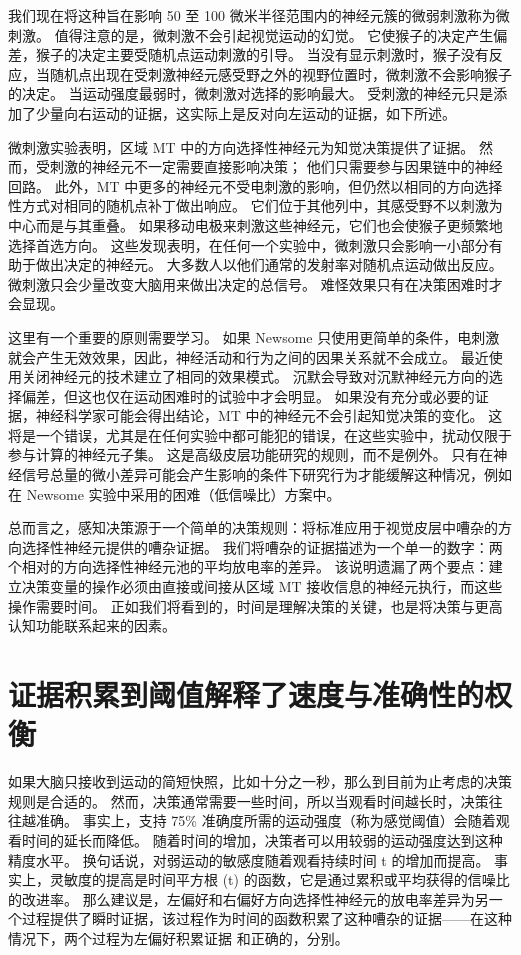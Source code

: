 我们现在将这种旨在影响 50 至 100 微米半径范围内的神经元簇的微弱刺激称为微刺激。
值得注意的是，微刺激不会引起视觉运动的幻觉。
它使猴子的决定产生偏差，猴子的决定主要受随机点运动刺激的引导。
当没有显示刺激时，猴子没有反应，当随机点出现在受刺激神经元感受野之外的视野位置时，微刺激不会影响猴子的决定。
当运动强度最弱时，微刺激对选择的影响最大。
受刺激的神经元只是添加了少量向右运动的证据，这实际上是反对向左运动的证据，如下所述。


微刺激实验表明，区域 MT 中的方向选择性神经元为知觉决策提供了证据。
然而，受刺激的神经元不一定需要直接影响决策；
他们只需要参与因果链中的神经回路。
此外，MT 中更多的神经元不受电刺激的影响，但仍然以相同的方向选择性方式对相同的随机点补丁做出响应。
它们位于其他列中，其感受野不以刺激为中心而是与其重叠。
如果移动电极来刺激这些神经元，它们也会使猴子更频繁地选择首选方向。
这些发现表明，在任何一个实验中，微刺激只会影响一小部分有助于做出决定的神经元。
大多数人以他们通常的发射率对随机点运动做出反应。
微刺激只会少量改变大脑用来做出决定的总信号。
难怪效果只有在决策困难时才会显现。


这里有一个重要的原则需要学习。
如果 Newsome 只使用更简单的条件，电刺激就会产生无效效果，因此，神经活动和行为之间的因果关系就不会成立。
最近使用关闭神经元的技术建立了相同的效果模式。
沉默会导致对沉默神经元方向的选择偏差，但这也仅在运动困难时的试验中才会明显。
如果没有充分或必要的证据，神经科学家可能会得出结论，MT 中的神经元不会引起知觉决策的变化。
这将是一个错误，尤其是在任何实验中都可能犯的错误，在这些实验中，扰动仅限于参与计算的神经元子集。
这是高级皮层功能研究的规则，而不是例外。
只有在神经信号总量的微小差异可能会产生影响的条件下研究行为才能缓解这种情况，例如在 Newsome 实验中采用的困难（低信噪比）方案中。


总而言之，感知决策源于一个简单的决策规则：将标准应用于视觉皮层中嘈杂的方向选择性神经元提供的嘈杂证据。
我们将嘈杂的证据描述为一个单一的数字：两个相对的方向选择性神经元池的平均放电率的差异。
该说明遗漏了两个要点：建立决策变量的操作必须由直接或间接从区域 MT 接收信息的神经元执行，而这些操作需要时间。
正如我们将看到的，时间是理解决策的关键，也是将决策与更高认知功能联系起来的因素。



\section{证据积累到阈值解释了速度与准确性的权衡}

如果大脑只接收到运动的简短快照，比如十分之一秒，那么到目前为止考虑的决策规则是合适的。
然而，决策通常需要一些时间，所以当观看时间越长时，决策往往越准确。
事实上，支持 75\% 准确度所需的运动强度（称为感觉阈值）会随着观看时间的延长而降低。
随着时间的增加，决策者可以用较弱的运动强度达到这种精度水平。
换句话说，对弱运动的敏感度随着观看持续时间 t 的增加而提高。
事实上，灵敏度的提高是时间平方根 (t) 的函数，它是通过累积或平均获得的信噪比的改进率。
那么建议是，左偏好和右偏好方向选择性神经元的放电率差异为另一个过程提供了瞬时证据，该过程作为时间的函数积累了这种嘈杂的证据——在这种情况下，两个过程为左偏好积累证据 和正确的，分别。


